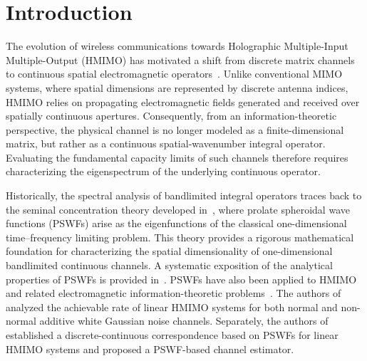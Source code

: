 \documentclass[lettersize,journal]{IEEEtran}
\theoremstyle{plain}
\begin{document}
\section{Introduction}
\label{sec:Introduction}
The evolution of wireless communications towards Holographic Multiple-Input Multiple-Output (HMIMO) has motivated a shift from discrete matrix channels to continuous spatial electromagnetic operators~\cite{Wei2026EIT,Hu2026Electromagnetic}. Unlike conventional MIMO systems, where spatial dimensions are represented by discrete antenna indices, HMIMO relies on propagating electromagnetic fields generated and received over spatially continuous apertures. Consequently, from an information-theoretic perspective, the physical channel is no longer modeled as a finite-dimensional matrix, but rather as a continuous spatial-wavenumber integral operator. Evaluating the fundamental capacity limits of such channels therefore requires characterizing the eigenspectrum of the underlying continuous operator.

Historically, the spectral analysis of bandlimited integral operators traces back to the seminal concentration theory developed in~\cite{Slepian1961Prolate}, where prolate spheroidal wave functions (PSWFs) arise as the eigenfunctions of the classical one-dimensional time--frequency limiting problem. This theory provides a rigorous mathematical foundation for characterizing the spatial dimensionality of one-dimensional bandlimited continuous channels. A systematic exposition of the analytical properties of PSWFs is provided in~\cite{osipov2013prolate}.
PSWFs have also been applied to HMIMO and related electromagnetic information-theoretic problems~\cite{Liang2024Achievable, zhu2026mimocapacity}. The authors of~\cite{Liang2024Achievable} analyzed the achievable rate of linear HMIMO systems for both normal and non-normal additive white Gaussian noise channels. Separately, the authors of~\cite{zhu2026mimocapacity} established a discrete-continuous correspondence based on PSWFs for linear HMIMO systems and proposed a PSWF-based channel estimator.
\end{document}
